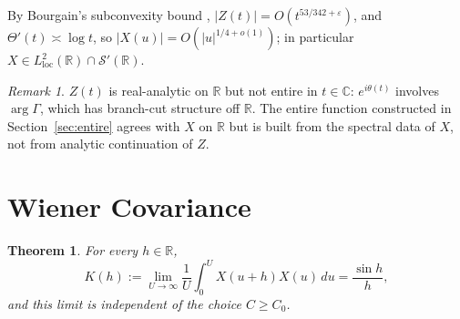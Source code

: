 \documentclass[12pt]{amsart}
\newtheorem{theorem}{Theorem}
\theoremstyle{remark}
\newtheorem*{remark}{Remark}
\begin{document}
By Bourgain's subconvexity bound \cite{Bourgain}, $|Z(t)|=O(t^{53/342+\varepsilon})$,
and $\Theta'(t)\asymp\log t$, so $|X(u)|=O(|u|^{1/4+o(1)})$;
in particular $X\in L^2_\mathrm{loc}(\mathbb{R})\cap\mathcal{S}'(\mathbb{R})$.

\begin{remark}
$Z(t)$ is real-analytic on $\mathbb{R}$ but not entire in $t\in\mathbb{C}$:
$e^{i\theta(t)}$ involves $\arg\Gamma$, which has branch-cut structure
off $\mathbb{R}$.  The entire function constructed in
Section~\ref{sec:entire} agrees with $X$ on $\mathbb{R}$ but is built
from the spectral data of $X$, not from analytic continuation of $Z$.
\end{remark}

\section{Wiener Covariance}\label{sec:wiener}

\begin{theorem}\label{thm:wiener}
For every $h\in\mathbb{R}$,
\[
  K(h):=\lim_{U\to\infty}\frac{1}{U}\int_0^U X(u+h)X(u)\,du
  =\frac{\sin h}{h},
\]
and this limit is independent of the choice $C\geq C_0$.
\end{theorem}
\end{document}

